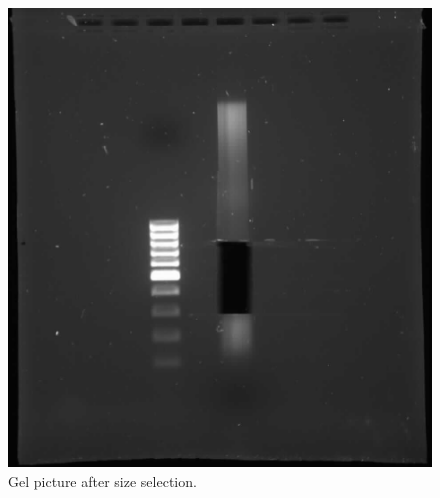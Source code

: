 %
\begin{figure}[htb]
\begin{center}
\includegraphics[scale=0.3]{GelSizeSelection_071011}
\caption{Gel picture after size selection.}
\label{SizeSel}
\end{center}
\end{figure}


